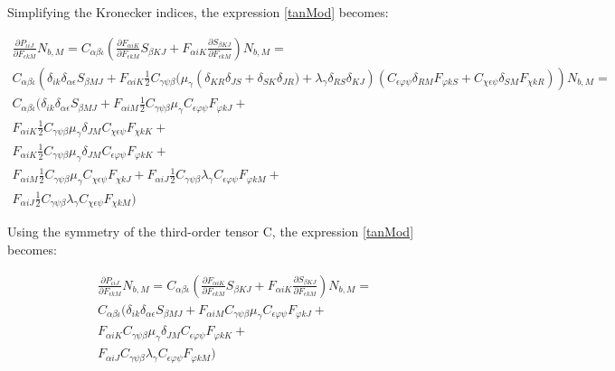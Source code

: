\documentclass[oneside,11pt,times]{book}
\begin{document}
Simplifying the Kronecker indices, the expression \eqref{tanMod} becomes:

\begin{equation}
\label{tanModFinal}
    \begin{gathered}
 \frac{\partial P_{ \iota iJ}}{\partial F_{ \epsilon kM}} N_{b,M} = C_{\alpha \beta \iota} (\frac{\partial F_{ \alpha iK}}{\partial F_{ \epsilon kM}} S_{ \beta KJ} + F_{ \alpha iK} \frac{\partial S_{ \beta KJ}}{\partial F_{ \epsilon kM}})N_{b,M}  = \\
 C_{\alpha \beta \iota}\left(\delta_{ik} \delta_{\alpha \epsilon} S_{ \beta MJ} + F_{ \alpha iK} \frac{1}{2}C_{\gamma \psi \beta} (\mu_{\gamma}\left(\delta_{KR}\delta_{JS} + \delta_{SK}\delta_{JR}) + \lambda_{\gamma} \delta_{RS}\delta_{KJ}\right)\left(C_{\epsilon \varphi \psi}\delta_{RM} F_{ \varphi kS} + C_{\chi \epsilon \psi}\delta_{SM}F_{ \chi kR}\right)\right)N_{b,M} =
 \\
 C_{\alpha \beta \iota}(\delta_{ik} \delta_{\alpha \epsilon} S_{ \beta MJ} +   F_{ \alpha iM} \frac{1}{2}C_{\gamma \psi \beta} \mu_{\gamma}C_{\epsilon \varphi \psi} F_{ \varphi kJ} + \\ F_{ \alpha iK} \frac{1}{2}C_{\gamma \psi \beta} \mu_{\gamma}\delta_{JM} C_{\chi \epsilon \psi}F_{ \chi kK} + \\ F_{ \alpha iK} \frac{1}{2}C_{\gamma \psi \beta} \mu_{\gamma}\delta_{JM}C_{\epsilon \varphi \psi} F_{ \varphi kK} + \\ F_{ \alpha iM} \frac{1}{2}C_{\gamma \psi \beta} \mu_{\gamma}C_{\chi \epsilon \psi}F_{ \chi kJ} + F_{ \alpha iJ} \frac{1}{2}C_{\gamma \psi \beta}\lambda_{\gamma}C_{\epsilon \varphi \psi} F_{ \varphi kM} + \\ F_{ \alpha iJ} \frac{1}{2}C_{\gamma \psi \beta}\lambda_{\gamma}C_{\chi \epsilon \psi}F_{ \chi kM})
  \end{gathered}
\end{equation}

Using the symmetry of the third-order tensor C, the expression \eqref{tanMod} becomes:

\begin{equation}
\label{tanModFinal}
    \begin{gathered}
 \frac{\partial P_{ \iota iJ}}{\partial F_{ \epsilon kM}} N_{b,M} = C_{\alpha \beta \iota} (\frac{\partial F_{ \alpha iK}}{\partial F_{ \epsilon kM}} S_{ \beta KJ} + F_{ \alpha iK} \frac{\partial S_{ \beta KJ}}{\partial F_{ \epsilon kM}})N_{b,M}  = \\
 C_{\alpha \beta \iota}(\delta_{ik} \delta_{\alpha \epsilon} S_{ \beta MJ} +   F_{ \alpha iM} C_{\gamma \psi \beta} \mu_{\gamma}C_{\epsilon \varphi \psi} F_{ \varphi kJ} + \\ F_{ \alpha iK}C_{\gamma \psi \beta} \mu_{\gamma}\delta_{JM} C_{\epsilon \varphi \psi}F_{ \varphi kK} + \\ F_{ \alpha iJ}C_{\gamma \psi \beta}\lambda_{\gamma}C_{\epsilon \varphi \psi} F_{ \varphi kM})
  \end{gathered}
\end{equation}
\end{document}
